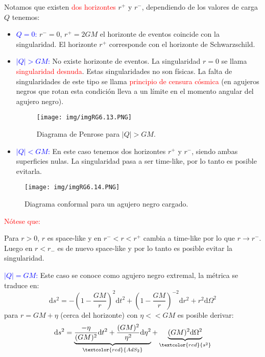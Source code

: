 \documentclass[../main]{subfiles}
\begin{document}
\begin{adjustwidth}{0pt}{-100pt}
Notamos que existen \textcolor{red}{dos horizontes} $r^+$ y $r^-$, dependiendo de los valores de carga $Q$ tenemos:
\begin{itemize}
    \item \textcolor{blue}{$Q=0$:} $r^-=0$, $r^+=2GM$ el horizonte de eventos coincide con la singularidad. El horizonte $r^+$ corresponde con el horizonte de Schwarzschild.
    \item \textcolor{blue}{$|Q|>GM$:} No existe horizonte de eventos. La singularidad $r=0$ se llama \textcolor{red}{singularidad desnuda}. Estas singularidades no son físicas. La falta de singularidades de este tipo se llama \textcolor{red}{principio de censura cósmica} (en agujeros negros que rotan esta condición lleva a un límite en el momento angular del agujero negro).
    \begin{figure}[H]
        \begin{adjustwidth}{0pt}{-100pt}
        \centering
        \texttt{[image: img/imgRG6.13.PNG]}
        \caption{Diagrama de Penrose para $|Q|>GM$.}
        \end{adjustwidth}
    \end{figure}
    \item \textcolor{blue}{$|Q|<GM$:} En este caso tenemos dos horizontes $r^+$ y $r^-$, siendo ambas superficies nulas. La singularidad pasa a ser time-like, por lo tanto es posible evitarla.
\end{itemize}
\begin{figure}[H]
    \begin{adjustwidth}{0pt}{-100pt}
    \centering
    \texttt{[image: img/imgRG6.14.PNG]}
    \caption{Diagrama conformal para un agujero negro cargado.}
    \end{adjustwidth}
\end{figure}

\textcolor{red}{Nótese que:}

Para $r>0$, $r$ es space-like y en $r^-< r <r^+$ cambia a time-like por lo que $r\rightarrow r^-$. Luego en $r<r_-$ es de nuevo space-like y por lo tanto es posible evitar la singularidad.

\textcolor{blue}{$|Q|=GM$:} Este caso se conoce como agujero negro extremal, la métrica se traduce en:
\begin{equation}
    \mathrm{d}s^2=-\left(1-\dfrac{GM}{r}\right)^2 \mathrm{d}t^2+\left(1-\dfrac{GM}{r}\right)^{-2}\mathrm{d}r^2+r^2\mathrm{d}\Omega^2
\end{equation}
para $r=GM+\eta$ (cerca del horizonte) con $\eta<< GM$ es posible derivar:
\begin{equation}
    \mathrm{d}s^2=\underbrace{\dfrac{-\eta}{(GM)^2}\mathrm{d}t^2+\dfrac{(GM)^2}{\eta^2}\mathrm{d}\eta^2}_{\textcolor{red}{AdS_2}}+\underbrace{(GM)^2\mathrm{d}\Omega^2}_{\textcolor{red}{s^2}}
\end{equation}


\end{adjustwidth}
\end{document}
